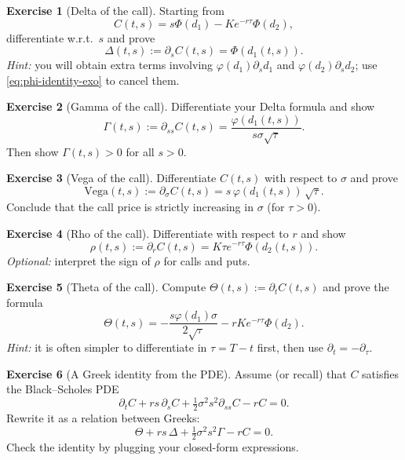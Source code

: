 \documentclass[11pt]{article}
\newcommand{\1}{\mathbf{1}}
\theoremstyle{definition}
\newtheorem{exercise}{Exercise}[section]
\begin{document}
\begin{exercise}[Delta of the call]
Starting from
$$
C(t,s)=s\Phi(d_1)-K e^{-r\tau}\Phi(d_2),
$$
differentiate w.r.t.\ $s$ and prove
$$
\boxed{\ \Delta(t,s):=\partial_s C(t,s)=\Phi(d_1(t,s)).\ }
$$
\emph{Hint:} you will obtain extra terms involving $\varphi(d_1)\partial_s d_1$ and
$\varphi(d_2)\partial_s d_2$; use \eqref{eq:phi-identity-exo} to cancel them.
\end{exercise}

\begin{exercise}[Gamma of the call]
Differentiate your Delta formula and show
$$
\boxed{\ \Gamma(t,s):=\partial_{ss}C(t,s)=\frac{\varphi(d_1(t,s))}{s\sigma\sqrt{\tau}}.\ }
$$
Then show $\Gamma(t,s)>0$ for all $s>0$.
\end{exercise}

\begin{exercise}[Vega of the call]
Differentiate $C(t,s)$ with respect to $\sigma$ and prove
$$
\boxed{\ \text{Vega}(t,s):=\partial_\sigma C(t,s)= s\,\varphi(d_1(t,s))\,\sqrt{\tau}.\ }
$$
Conclude that the call price is strictly increasing in $\sigma$ (for $\tau>0$).
\end{exercise}

\begin{exercise}[Rho of the call]
Differentiate with respect to $r$ and show
$$
\boxed{\ \rho(t,s):=\partial_r C(t,s)=K \tau e^{-r\tau}\Phi(d_2(t,s)).\ }
$$
\emph{Optional:} interpret the sign of $\rho$ for calls and puts.
\end{exercise}

\begin{exercise}[Theta of the call]
Compute $\Theta(t,s):=\partial_t C(t,s)$ and prove the formula
$$
\boxed{\ 
\Theta(t,s)= -\frac{s\varphi(d_1)\sigma}{2\sqrt{\tau}}-rK e^{-r\tau}\Phi(d_2).
\ }
$$
\emph{Hint:} it is often simpler to differentiate in $\tau=T-t$ first, then use
$\partial_t=-\partial_\tau$.
\end{exercise}

\begin{exercise}[A Greek identity from the PDE]
Assume (or recall) that $C$ satisfies the Black--Scholes PDE
$$
\partial_t C + rs\,\partial_s C + \tfrac12\sigma^2 s^2 \partial_{ss}C - rC = 0.
$$
Rewrite it as a relation between Greeks:
$$
\boxed{\ \Theta + rs\,\Delta + \tfrac12\sigma^2 s^2 \Gamma - rC = 0.\ }
$$
Check the identity by plugging your closed-form expressions.
\end{exercise}

\end{document}
